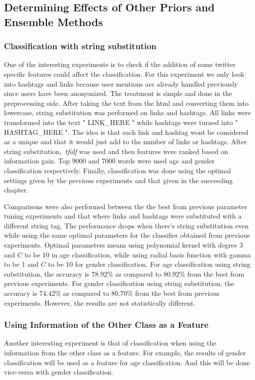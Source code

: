 \documentclass[a4paper]{llncs}
\begin{document}
\subsection{Determining Effects of Other Priors and Ensemble Methods}

\subsubsection{Classification with string substitution}
One of the interesting experiments is to check if the addition of some twitter specific features could affect the classification. For this experiment we only look into hashtags and links because user mentions are already handled previously since users have been anonymized. The treatment is simple and done in the preprocessing side. After taking the text from the html and converting them into lowercase, string substitution was performed on links and hashtags. All links were transformed into the text " LINK\_HERE " while hashtags were turned into " HASHTAG\_HERE ". The idea is that each link and hashtag wont be considered as a unique and that it would just add to the number of links or hashtags. After string substitution,~\textit{tfidf} was used and then features were ranked based on information gain. Top 9000 and 7000 words were used age and gender classification respectively. Finally, classification was done using the optimal settings given by the previous experiments and that given in the succeeding chapter. 

Comparisons were also performed between the the best from previous parameter tuning experiments and that where links and hashtags were substituted with a different string tag. The performance drops when there's string substitution even while using the same optimal parameters for the classifier obtained from previous experiments. Optimal parameters means using polynomial kernel with degree 3 and $C$ to be 10 in age classification, while using radial basis function with gamma to be 1 and $C$ to be 10 for gender classification. For age classification using string substitution, the accuracy is 78.92\% as compared to 80.92\% from the best from previous experiments. For gender classification using string substitution, the accuracy is 74.42\% as compared to 80.70\% from the best from previous experiments. However, the results are not statistically different.



\subsubsection{Using Information of the Other Class as a Feature}
Another interesting experiment is that of classification when using the information from the other class as a feature. For example, the results of gender classification will be used as a feature for age classification. And this will be done vice-versa with gender classification.  
\end{document}
